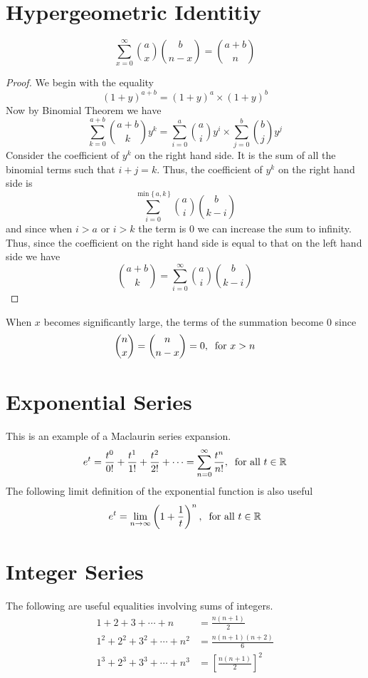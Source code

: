 \section{Hypergeometric Identitiy}
\[
    \sum_{x = 0}^{\infty} \binom{a}{x} \binom{b}{n-x} = \binom{a + b}{n}
\]
\begin{proof}
We begin with the equality
\[
    (1 + y)^{a + b} = (1 + y)^a \times (1 + y)^b
\]
Now by Binomial Theorem we have
\[
    \sum_{k = 0}^{a + b} \binom{a + b}{k} y^k = \sum_{i = 0}^{a} \binom{a}{i} y^i \times \sum_{j = 0}^{b} \binom{b}{j} y^j
\]
Consider the coefficient of $y^k$ on the right hand side. It is the sum of all the binomial terms such that $i + j = k$. Thus, the coefficient of $y^k$ on the right hand side is
\[
    \sum_{i = 0}^{\min\{\, a,k \,\}} \binom{a}{i} \binom{b}{k-i}
\]
and since when $i > a$ or $i > k$ the term is 0 we can increase the sum to infinity. Thus, since the coefficient on the right hand side is equal to that on the left hand side we have
\[
    \binom{a + b}{k} = \sum_{i = 0}^{\infty} \binom{a}{i} \binom{b}{k-i}
\]
\end{proof}
\begin{info}
When $x$ becomes significantly large, the terms of the summation become 0 since 
\[
    \binom{n}{x} = \binom{n}{n-x} = 0,\:\text{ for } x > n
\]
\end{info}
\section{Exponential Series}
This is an example of a Maclaurin series expansion.
\[
    e^t = \frac{t^0}{0!} + \frac{t^1}{1!} + \frac{t^2}{2!} + \cdots = \sum_{n = 0}^{\infty} \frac{t^n}{n!},\:\text{ for }\text{all } t\in\mathbb{R}
\]
The following limit definition of the exponential function is also useful
\[
    e^t = \lim_{n \rightarrow \infty}\left(1 + \frac{1}{t}\right)^n,\:\text{ for }\text{all } t\in\mathbb{R}
\]
\section{Integer Series}
The following are useful equalities involving sums of integers.
\begin{align*}
    1 + 2 + 3 + \cdots + n &= \frac{n(n+1)}{2} \\
    1^2 + 2^2 + 3^2 + \cdots + n^2 &= \frac{n(n+1)(n+2)}{6} \\
    1^3 + 2^3 + 3^3 + \cdots + n^3 &= \left[\frac{n(n+1)}{2}\right]^2
\end{align*}
